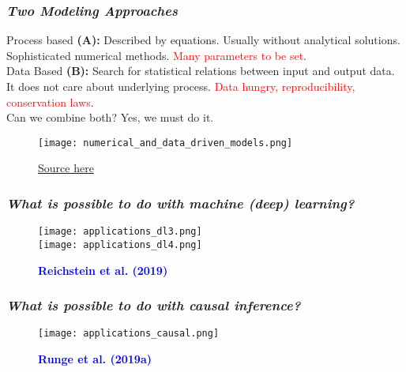 \documentclass[11pt]{beamer}
\newcommand{\citat}[2]{\textbf{\textcolor{blue}{#1 et al. (#2)}}}
\begin{document}
\begin{frame}[fragile]
  \frametitle{\normalsize{\textbf{
        \emph{Two Modeling Approaches}
  }}} 

  \scriptsize{

    \textbullet \: Process based \textbf{(A):} \: Described by equations. Usually
    without analytical solutions. Sophisticated numerical
    methods. \textcolor{red}{Many parameters to be set}. \\[0.10cm]

    \textbullet \:Data Based \textbf{(B):} \: Search for statistical relations
    between input and output data. It does not care about underlying
    process. \textcolor{red}{Data hungry, reproducibility, conservation
      laws}. \\[0.10cm]

    \textbullet \: Can we combine both? Yes, we must do it.
    
    \begin{figure}[h!]
      \centering
      \texttt{[image: numerical\_and\_data\_driven\_models.png]}
      \caption*{\scriptsize{
          \href{https://medium.com/@b.bhaskaran/data-driven-statistical-models-vs-process-driven-physical-models-340f4dd4eea8}{Source
            here}
      }}
    \end{figure}
    
  }
  
\end{frame}

\begin{frame}[fragile]
  \frametitle{\normalsize{\textbf{
        \emph{What is possible to do with machine (deep) learning?}
  }}} 

  \begin{figure}[h!]
    \centering
    \texttt{[image: applications\_dl3.png]} \\
    \texttt{[image: applications\_dl4.png]}
    \caption*{\scriptsize{
        \citat{Reichstein}{2019} 
      }}
  \end{figure}
  
\end{frame}

\begin{frame}[fragile]
  \frametitle{\normalsize{\textbf{
        \emph{What is possible to do with causal inference?}
  }}} 

  \begin{figure}[h!]
    \centering
    \texttt{[image: applications\_causal.png]}
    \caption*{\scriptsize{
        \citat{Runge}{2019a} 
      }}
  \end{figure}
  
\end{frame}
\end{document}
